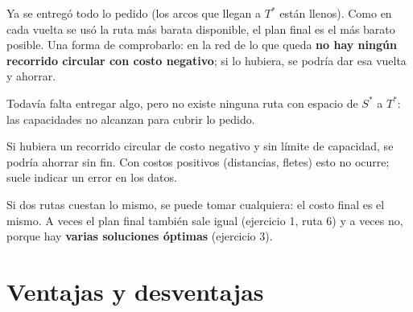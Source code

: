 \documentclass[11pt,a4paper]{article}
\newcommand{\Sini}{\ensuremath{S^{*}}}
\newcommand{\Tfin}{\ensuremath{T^{*}}}
\begin{document}
\begin{description}[leftmargin=0pt, itemsep=5pt]
  \item[Solución óptima.] Ya se entregó todo lo pedido (los arcos que llegan a \Tfin{} están llenos). Como en cada
        vuelta se usó la ruta más barata disponible, el plan final es el más barato posible. Una forma de
        comprobarlo: en la red de lo que queda \textbf{no hay ningún recorrido circular con costo negativo}; si lo
        hubiera, se podría dar esa vuelta y ahorrar.
  \item[Problema sin solución.] Todavía falta entregar algo, pero no existe ninguna ruta con espacio de \Sini{} a \Tfin:
        las capacidades no alcanzan para cubrir lo pedido.
  \item[Problema sin límite.] Si hubiera un recorrido circular de costo negativo y sin límite de capacidad, se podría
        ahorrar sin fin. Con costos positivos (distancias, fletes) esto no ocurre; suele indicar un error en los datos.
  \item[Empates.] Si dos rutas cuestan lo mismo, se puede tomar cualquiera: el costo final es el mismo. A veces
        el plan final también sale igual (ejercicio 1, ruta 6) y a veces no, porque hay \textbf{varias soluciones
        óptimas} (ejercicio 3).
\end{description}

\section{Ventajas y desventajas}
\end{document}
